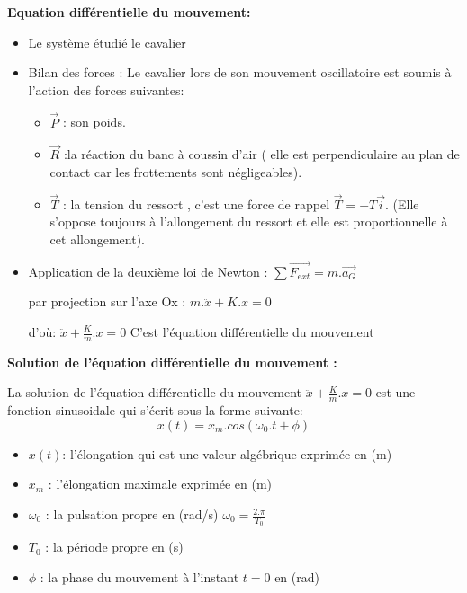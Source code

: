 \documentclass[12pt]{article}
\begin{document}
\textbf{Equation différentielle du mouvement: }
\begin{itemize}
	\item Le système étudié {le cavalier}

	\item Bilan des forces : Le cavalier lors de son mouvement oscillatoire est soumis à l'action des forces suivantes:
		\begin{itemize}
			\item $\vec{P}$ : son poids.
			\item $\vec{R}$ :la réaction du banc à coussin d'air ( elle est perpendiculaire au plan de contact car les frottements sont négligeables).
			\item $\vec{T}$ : la tension du ressort , c’est une force de rappel $\vec{T} = -T\vec{i}$.
(Elle s’oppose toujours à l’allongement du ressort et elle est proportionnelle à cet allongement).
		\end{itemize}
	\item Application de la deuxième loi de Newton : $\sum \vec{F_{ext}} = m.\vec{a_G}$

		par projection sur l'axe Ox : $m.\ddot{x} + K.x = 0$

		d’où: $\ddot{x} + \frac{K}{m}.x = 0$ C'est l'équation différentielle du mouvement

\end{itemize}

\textbf{Solution de l'équation différentielle du mouvement : }

La solution de l'équation différentielle du mouvement $\ddot{x} + \frac{K}{m}.x = 0$
est une fonction sinusoidale qui s'écrit sous la forme suivante: $$x(t) = x_m.cos(\omega_0.t + \phi)$$

\begin{center}
\end{center}

\begin{itemize}

	\item $x(t)$: l'élongation qui est une valeur algébrique exprimée en (m)
	\item $x_m$ : l'élongation maximale exprimée en (m)
	\item $\omega_0$ : la pulsation propre en (rad/s) $\omega_0 = \frac{2.\pi}{T_0}$
	\item $T_0$ : la période propre en (s)
	\item $\phi$ : la phase du mouvement à l'instant $t = 0$ en (rad)
\end{itemize}
\end{document}
